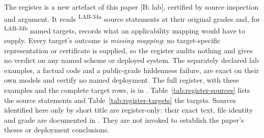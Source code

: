 \documentclass[pdflatex,sn-basic]{sn-jnl}%
\newcommand{\slot}[1]{}%
\newcommand{\rec}[1]{\ifannotated\textsuperscript{\textcolor{blue!60!black}{\tiny#1}}\fi}
\begin{document}
\begin{appendices}
\slot{D}
The register is a new artefact of this paper [B: lab], certified by source inspection and argument. It reads \numCFifteenSnapshots\rec{LAB-34a} source statements at their original grades and, for \numCFifteenTargets\rec{LAB-34b} named targets, records what an applicability mapping would have to supply. Every target's outcome is \emph{missing mapping}: no target-specific representation or certificate is supplied, so the register audits nothing and gives no verdict on any named scheme or deployed system. The separately declared lab examples, a factual code and a public-grade hiddenness failure, are exact on their own models and certify no named deployment. The full register, with these examples and the complete target rows, is in . Table~\ref{tab:register-sources} lists the source statements and Table~\ref{tab:register-targets} the targets. Sources identified here only by short title are register-only: their exact text, file identity and grade are documented in . They are not invoked to establish the paper's theses or deployment conclusions.


\end{appendices}
\end{document}
